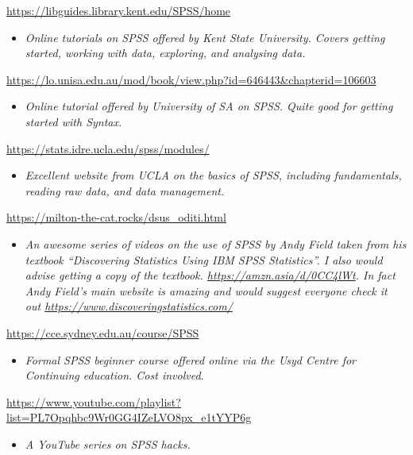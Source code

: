 \documentclass[
]{book}
\providecommand{\tightlist}{%
  \setlength{\itemsep}{0pt}\setlength{\parskip}{0pt}}
\begin{document}
\url{https://libguides.library.kent.edu/SPSS/home}

\begin{itemize}
\tightlist
\item
  \emph{Online tutorials on SPSS offered by Kent State University. Covers getting started, working with data, exploring, and analysing data.}
\end{itemize}

\url{https://lo.unisa.edu.au/mod/book/view.php?id=646443&chapterid=106603}

\begin{itemize}
\tightlist
\item
  \emph{Online tutorial offered by University of SA on SPSS. Quite good for getting started with Syntax.}
\end{itemize}

\url{https://stats.idre.ucla.edu/spss/modules/}

\begin{itemize}
\tightlist
\item
  \emph{Excellent website from UCLA on the basics of SPSS, including fundamentals, reading raw data, and data management.}
\end{itemize}

\url{https://milton-the-cat.rocks/dsus_oditi.html}

\begin{itemize}
\tightlist
\item
  \emph{An awesome series of videos on the use of SPSS by Andy Field taken from his textbook ``Discovering Statistics Using IBM SPSS Statistics''. I also would advise getting a copy of the textbook. \url{https://amzn.asia/d/0CC4lWt}. In fact Andy Field's main website is amazing and would suggest everyone check it out \url{https://www.discoveringstatistics.com/}}
\end{itemize}

\url{https://cce.sydney.edu.au/course/SPSS}

\begin{itemize}
\tightlist
\item
  \emph{Formal SPSS beginner course offered online via the Usyd Centre for Continuing education. Cost involved. }
\end{itemize}

\url{https://www.youtube.com/playlist?list=PL7Opqhbc9Wr0GG4IZeLVO8px_e1tYYP6g}

\begin{itemize}
\tightlist
\item
  \emph{A YouTube series on SPSS hacks.}
\end{itemize}
\end{document}
